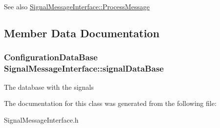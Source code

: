 \begin{DoxySeeAlso}{See also}
\hyperlink{classSignalMessageInterface_ae9f04a9f88929ffc4b9761a41d13cec7}{SignalMessageInterface::ProcessMessage} 
\end{DoxySeeAlso}


\subsection{Member Data Documentation}
\hypertarget{classSignalMessageInterface_a4444ccf4557431cbd475af82a8131d58}{
\subsubsection[{signalDataBase}]{\setlength{\rightskip}{0pt plus 5cm}ConfigurationDataBase {\bf SignalMessageInterface::signalDataBase}}}
\label{classSignalMessageInterface_a4444ccf4557431cbd475af82a8131d58}
The database with the signals 

The documentation for this class was generated from the following file:\begin{DoxyCompactItemize}
\item 
SignalMessageInterface.h\end{DoxyCompactItemize}
